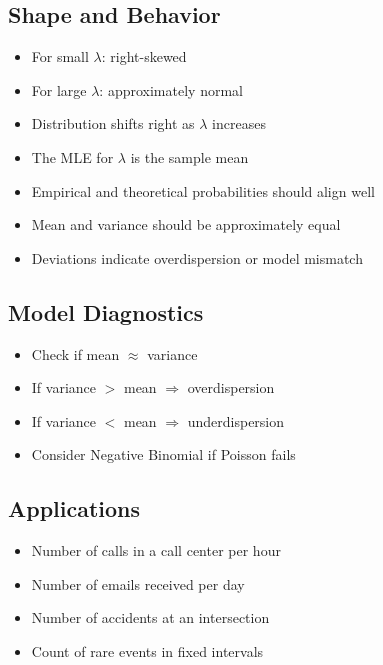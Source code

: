 \documentclass[10pt,a4paper]{article}
\begin{document}
\subsection{Shape and Behavior}

\begin{itemize}
 \item For small $\lambda$: right-skewed
 \item For large $\lambda$: approximately normal
 \item Distribution shifts right as $\lambda$ increases
\end{itemize}
	

	\begin{itemize}
	    \item The MLE for $\lambda$ is the sample mean
	    \item Empirical and theoretical probabilities should align well
	    \item Mean and variance should be approximately equal
	    \item Deviations indicate overdispersion or model mismatch
	\end{itemize}
	
	
	\subsection{Model Diagnostics}
	
	\begin{itemize}
	    \item Check if mean $\approx$ variance
	    \item If variance $>$ mean $\Rightarrow$ overdispersion
	    \item If variance $<$ mean $\Rightarrow$ underdispersion
	    \item Consider Negative Binomial if Poisson fails
	\end{itemize}
	
	
	\subsection{Applications}
	
	\begin{itemize}
	    \item Number of calls in a call center per hour
	    \item Number of emails received per day
	    \item Number of accidents at an intersection
	    \item Count of rare events in fixed intervals
	\end{itemize}
	
\end{document}
